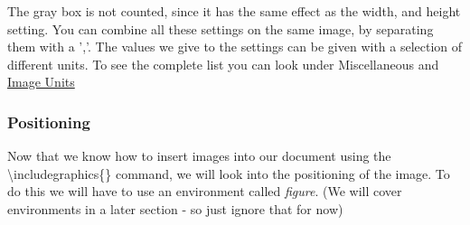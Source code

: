 \documentclass{article}
\newcommand{\bs}[1]{\textbackslash{}#1} %
\begin{document}
The gray box is not counted, since it has the same effect as the width, and height setting.
You can combine all these settings on the same image, by separating them with a ','. The values we give to the settings 
can be given with a selection of different units. To see the complete list you can look under Miscellaneous and \hyperref[secc:Image-Units]{Image Units}

\subsubsection{Positioning}
Now that we know how to insert images into our document using the \bs{includegraphics\{\}} command, we will
look into the positioning of the image. To do this we will have to use an environment called \textit{figure}.
(We will cover environments in a later section - so just ignore that for now)
\end{document}
